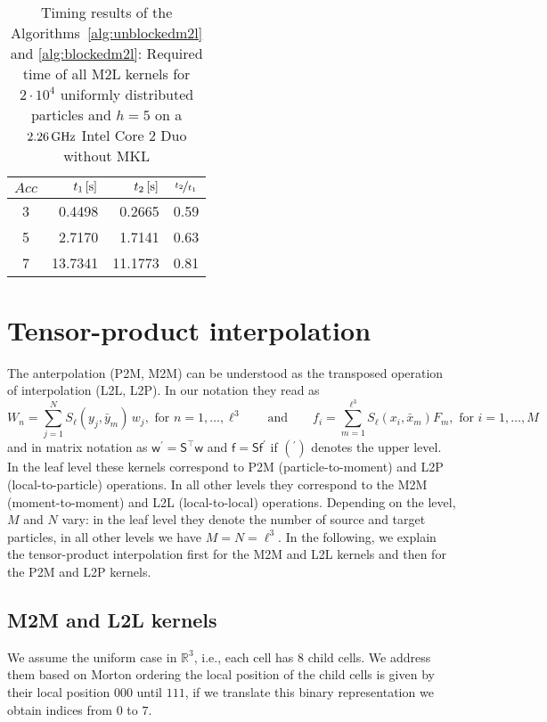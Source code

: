 \documentclass[]{article}
\newcommand{\Mat}[1]{\mathsf{#1}}  %
\theoremstyle{plain}
\begin{document}
\begin{table}[htbp]
  \caption{Timing results of the Algorithms~\ref{alg:unblockedm2l} and
    \ref{alg:blockedm2l}: Required time of all M2L kernels for
    $2\cdot10^4$ uniformly distributed particles and $h=5$ 
    on a $\unit[2.26]{GHz}$ Intel Core $2$ Duo without MKL}
  \label{tab:timings_alg1_alg2}
  \centering
    \begin{tabular}{c | r r | c}
      \toprule
      $Acc$ & $\unit[t_1]{[s]}$ & $\unit[t_2]{[s]}$ & $\nicefrac{t_2}{t_1}$ \\  
      \midrule
      3 &  0.4498 &  0.2665 & 0.59 \\
      5 &  2.7170 &  1.7141 & 0.63 \\
      7 & 13.7341 & 11.1773 & 0.81 \\
      \bottomrule
  \end{tabular}
\end{table}


\section{Tensor-product interpolation}
\label{sec:tensorinterpol}
The anterpolation (P2M, M2M) can be understood as the transposed operation of
interpolation (L2L, L2P). In our notation they read as
\begin{equation}
  \label{eq:m2ml2l}
  W_n = \sum_{j=1}^N S_\ell(y_j,\bar y_m) \, w_j, \text{ for }
  n=1,\dots,\ell^3 \qquad \text{and} \qquad
  f_i = \sum_{m=1}^{\ell^3} S_\ell(x_i,\bar x_m) F_m, \text{ for }
  i=1,\dots,M
\end{equation}
and in matrix notation as $\Mat{w}^\prime = \Mat{S}^\top \Mat{w}$ and $\Mat{f}
= \Mat{Sf}^\prime$ if $(^\prime)$ denotes the upper level. In the leaf level
these kernels correspond to P2M (particle-to-moment) and L2P
(local-to-particle) operations. In all other levels they correspond to the M2M
(moment-to-moment) and L2L (local-to-local) operations. Depending on the
level, $M$ and $N$ vary: in the leaf level they denote the number of source
and target particles, in all other levels we have $M=N=\ell^3$. In the
following, we explain the tensor-product interpolation first for the M2M and
L2L kernels and then for the P2M and L2P kernels.


\subsection{M2M and L2L kernels}
\label{sec:m2ml2l}
We assume the uniform case in $\mathbb{R}^3$, i.e., each cell has $8$ child
cells. We address them based on Morton ordering \citep[see][]{Warren1993}
the local position of the child cells is given by their local position $000$
until $111$, if we translate this binary representation we obtain indices from
$0$ to $7$.
\end{document}
